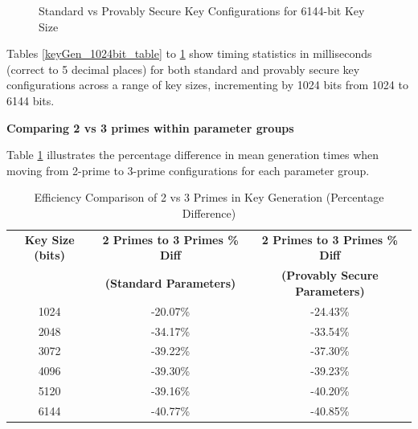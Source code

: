 \documentclass[]{final_report}
\theoremstyle{definition}
\begin{document}
\begin{figure}[H]

    \centering %
     \caption{Standard vs Provably Secure Key Configurations for 6144-bit Key Size}
    \begin{minipage}{\textwidth}
        \centering
        \label{fig:image1}
    \end{minipage}
        \label{keyGen_6144bit_table}
\end{figure}



Tables \ref{keyGen_1024bit_table} to \ref{keyGen_6144bit_table} show timing statistics in milliseconds (correct to 5 decimal places) for both standard and provably secure key configurations across a range of key sizes, incrementing by 1024 bits from 1024 to 6144 bits. 


\textbf{Comparing 2 vs 3 primes within parameter groups}

Table \ref{tab:2vs3primes_percentage} illustrates the percentage difference in mean generation times when moving from 2-prime to 3-prime configurations for each parameter group. 

\begin{table}[H]
\centering
\caption{Efficiency Comparison of 2 vs 3 Primes in Key Generation (Percentage Difference)}
\begin{tabular}{|c|c|c|}
\hline
\textbf{Key Size (bits)} & \textbf{2 Primes to 3 Primes \% Diff} & \textbf{2 Primes to 3 Primes \% Diff} \\
 & \textbf{(Standard Parameters)} & \textbf{(Provably Secure Parameters)} \\
\hline
1024 & -20.07\% & -24.43\% \\
2048 & -34.17\% & -33.54\% \\
3072 & -39.22\% & -37.30\% \\
4096 & -39.30\% & -39.23\% \\
5120 & -39.16\% & -40.20\% \\
6144 & -40.77\% & -40.85\% \\
\hline
\end{tabular}
\label{tab:2vs3primes_percentage}
\end{table}
\end{document}
